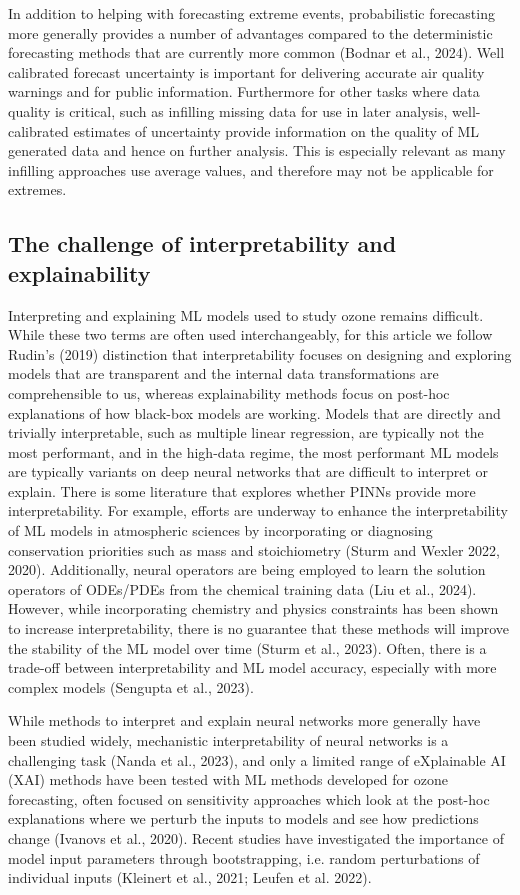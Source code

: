 \documentclass[gmd, manuscript]{copernicus}
\begin{document}
In addition to helping with forecasting extreme events, probabilistic forecasting more generally provides a number of advantages compared to the deterministic forecasting methods that are currently more common (Bodnar et al., 2024). Well calibrated forecast uncertainty is important for delivering accurate air quality warnings and for public information. Furthermore for other tasks where data quality is critical, such as infilling missing data for use in later analysis, well-calibrated estimates of uncertainty provide information on the quality of ML generated data and hence on further analysis. This is especially relevant as many infilling approaches use average values, and therefore may not be applicable for extremes. 

\subsection{The challenge of interpretability and explainability}
Interpreting and explaining ML models used to study ozone remains difficult. While these two terms are often used interchangeably, for this article we follow Rudin’s (2019) distinction that interpretability focuses on designing and exploring models that are transparent and the internal data transformations are comprehensible to us, whereas explainability methods focus on post-hoc explanations of how black-box models are working. Models that are directly and trivially interpretable, such as multiple linear regression, are typically not the most performant, and in the high-data regime, the most performant ML models are typically variants on deep neural networks that are difficult to interpret or explain. There is some literature that explores whether PINNs provide more interpretability. For example, efforts are underway to enhance the interpretability of ML models in atmospheric sciences by incorporating or diagnosing conservation priorities such as mass and stoichiometry (Sturm and Wexler 2022, 2020). Additionally, neural operators are being employed to learn the solution operators of ODEs/PDEs from the chemical training data (Liu et al., 2024). However, while incorporating chemistry and physics constraints has been shown to increase interpretability, there is no guarantee that these methods will improve the stability of the ML model over time (Sturm et al., 2023). Often, there is a trade-off between interpretability and ML model accuracy, especially with more complex models (Sengupta et al., 2023).

While methods to interpret and explain neural networks more generally have been studied widely, mechanistic interpretability of neural networks is a challenging task (Nanda et al., 2023), and only a limited range of eXplainable AI (XAI) methods have been tested with ML methods developed for ozone forecasting, often focused on sensitivity approaches which look at the post-hoc explanations where we perturb the inputs to models and see how predictions change (Ivanovs et al., 2020). Recent studies have investigated the importance of model input parameters through bootstrapping, i.e. random perturbations of individual inputs (Kleinert et al., 2021; Leufen et al. 2022).
\end{document}

